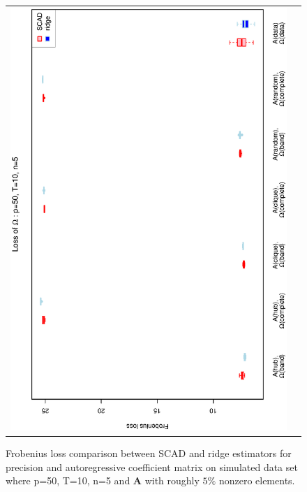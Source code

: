 \begin{figure}[h!]
\begin{tabular}{cc}
\includegraphics[scale=0.45,angle=270]{LossOmega50T10N5_5.eps}\\
\end{tabular}
\caption{Frobenius loss comparison between SCAD and ridge estimators for precision and autoregressive coefficient matrix on simulated data set where p=50, T=10, n=5 and $\mathbf{A}$ with roughly $5\%$ nonzero elements.}
\label{figSM:Loss50T10N5_5}
\end{figure}
\clearpage


